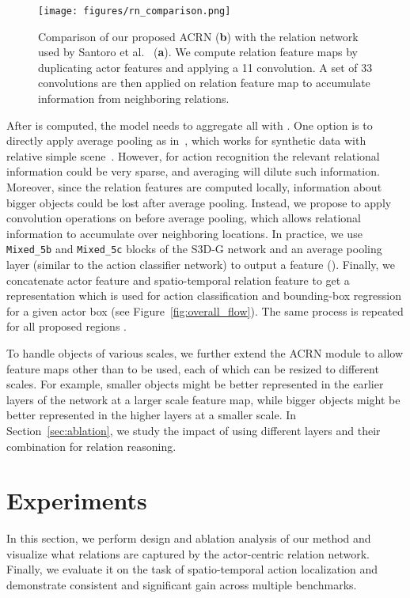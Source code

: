 \documentclass[runningheads]{llncs}
\newcommand{\mixed}[1]{\texttt{Mixed\_#1}}
\begin{document}
\begin{figure}[t]
    \centering
    \texttt{[image: figures/rn\_comparison.png]}
    \caption{Comparison of our proposed ACRN (\textbf{b})  with the relation network used by Santoro et al.~\cite{RN_deepmind17} (\textbf{a}). We compute relation feature maps by duplicating actor features and applying a 11 convolution. A set of 33 convolutions are then applied on relation feature map to accumulate information from neighboring relations.}
    \label{fig:acrn_compare}
\end{figure}

After  is computed, the model needs to aggregate all  with . One option is to directly apply average pooling as in~\cite{RN_deepmind17}, which works for synthetic data with relative simple scene~\cite{CLEVR}. However, for action recognition the relevant relational information could be very sparse, and averaging will dilute such information. Moreover, since the relation features are computed locally, information about bigger objects could be lost after average pooling. Instead, we propose to apply convolution operations on  before average pooling, which allows relational information to accumulate over neighboring locations. In practice, we use \mixed{5b} and \mixed{5c} blocks of the S3D-G network and an average pooling layer (similar to the action classifier network) to output a  feature (). Finally, we concatenate actor feature  and spatio-temporal relation feature  to get a  representation which is used for action classification and bounding-box regression for a given actor box  (see Figure~\ref{fig:overall_flow}). The same process is repeated for all proposed regions .

To handle objects of various scales, we further extend the ACRN module to allow feature maps other than  to be used, each of which can be resized to different scales. For example, smaller objects might be better represented in the earlier layers of the network at a larger scale feature map, while bigger objects might be better represented in the higher layers at a smaller scale. In Section~\ref{sec:ablation}, we study the impact of using different layers and their combination for relation reasoning. 
\section{Experiments}
In this section, we perform design and ablation analysis of our method and visualize what relations are captured by the actor-centric relation network. Finally, we evaluate it on the task of spatio-temporal action localization and demonstrate consistent and significant gain across multiple benchmarks.
\end{document}
